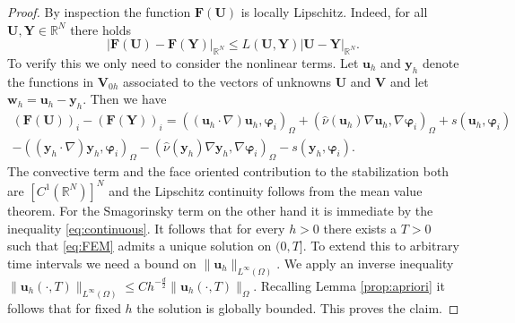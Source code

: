 \documentclass[10pt]{amsart}
\numberwithin{equation}{section}
\theoremstyle{definition}
\theoremstyle{remark}
\newcommand{\bF}{\bld{F}}
\renewcommand{\(}{\bigl(}
\renewcommand{\)}{\bigr)}
\newcommand{\bld}[1]{\boldsymbol{#1}}
\newcommand{\bY}{\bld{Y}}
\newcommand{\bv}{\bld{v}}
\newcommand{\bw}{\bld{w}}
\newcommand{\bu}{\bld{u}}
\newcommand{\bhu}{\hat{\bld{u}}}
\newcommand{\bU}{\bld{U}}
\newcommand{\bV}{\bld{V}}
\newcommand{\by}{\bld{y}}
\newcommand{\bvarphi}{\bm \varphi}
\begin{document}
\begin{proof}
By inspection the function
$\bF(\bU)$ is locally Lipschitz. Indeed, for all $\bU, \bY \in \mathbb{R}^N$ there holds
\begin{equation}\label{eq:Lip}
|\bF(\bU) - \bF(\bY)|_{\mathbb{R}^N} \leq L(\bU, \bY) |\bU - \bY|_{\mathbb{R}^N}.
\end{equation}
To verify this we only need to consider the nonlinear terms. Let $\bu_h$ and $\by_h$ denote the functions in
$\bV_{0h}$ associated to the vectors of unknowns $\bU$ and $\bV$ and let $\bw_h = \bu_h -
\by_h$. Then we have
\begin{multline}
(\bF(\bU))_i -  (\bF(\bY))_i = ((\bu_h \cdot \nabla) \bu_h,\bvarphi_i)_\Omega+
(\hat \nu(\bu_h) \nabla \bu_h,\nabla \bvarphi_i)_\Omega + s(\bu_h,\bvarphi_i) \\
-
((\by_h \cdot \nabla) \by_h, \bvarphi_i)_\Omega -  (\hat \nu(\by_h) \nabla \by_h,\nabla \bvarphi_i)_\Omega-  s(\by_h,\bvarphi_i).
\end{multline}
The convective term and the face oriented contribution to the
stabilization both are $[C^1(\mathbb{R}^N)]^N$ and the Lipschitz
continuity follows from the mean value theorem. For the Smagorinsky
term on the other hand it is immediate by the inequality \eqref{eq:continuous}.
It follows that for every $h>0$ there
 exists a $T>0$ such that \eqref{eq:FEM} admits a unique solution on
 $(0,T]$. To extend this to arbitrary time intervals we need a bound on
 $\|\bu_h\|_{L^\infty(\Omega)}$. 
 We apply an inverse inequality
 $\|\bu_h(\cdot,T)\|_{L^\infty(\Omega)} \leq C h^{-\frac{d}{2}}
 \|\bu_h(\cdot,T)\|_\Omega$. Recalling Lemma \ref{prop:apriori} it follows that for fixed $h$ the
 solution is globally bounded. 
This proves the claim.
\end{proof}
\end{document}
